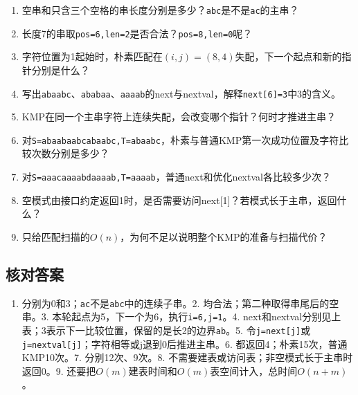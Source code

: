 \begin{enumerate}
\def\labelenumi{\arabic{enumi}.}
\tightlist
\item
  空串和只含三个空格的串长度分别是多少？\texttt{abc}是不是\texttt{ac}的主串？
\item
  长度7的串取\texttt{pos=\allowbreak{}6,\allowbreak{}len=\allowbreak{}2}是否合法？\texttt{pos=\allowbreak{}8,\allowbreak{}len=\allowbreak{}0}呢？
\item
  字符位置为1起始时，朴素匹配在\((i,j)=(8,4)\)失配，下一个起点和新的指针分别是什么？
\item
  写出\texttt{abaabc}、\texttt{ababaa}、\texttt{aaaab}的next与nextval，解释\texttt{next[\allowbreak{}6]\allowbreak{}=\allowbreak{}3}中3的含义。
\item
  KMP在同一个主串字符上连续失配，会改变哪个指针？何时才推进主串？
\item
  对\texttt{S=\allowbreak{}abaabaabcabaabc,\allowbreak{}T=\allowbreak{}abaabc}，朴素与普通KMP第一次成功位置及字符比较次数分别是多少？
\item
  对\texttt{S=\allowbreak{}aaacaaaabdaaaab,\allowbreak{}T=\allowbreak{}aaaab}，普通next和优化nextval各比较多少次？
\item
  空模式由接口约定返回1时，是否需要访问next{[}1{]}？若模式长于主串，返回什么？
\item
  只给匹配扫描的\(O(n)\)，为何不足以说明整个KMP的准备与扫描代价？
\end{enumerate}

\subsection{核对答案}\label{DS04-answers}

\begin{enumerate}
\def\labelenumi{\arabic{enumi}.}
\tightlist
\item
  分别为0和3；\texttt{ac}不是\texttt{abc}中的连续子串。2. 均合法；第二种取得串尾后的空串。3. 本轮起点为5，下一个为6，执行\texttt{i=\allowbreak{}6,\allowbreak{}j=\allowbreak{}1}。4. next和nextval分别见上表；3表示下一比较位置，保留的是长2的边界\texttt{ab}。5. 令\texttt{j=\allowbreak{}next[\allowbreak{}j]\allowbreak{}}或\texttt{j=\allowbreak{}nextval[\allowbreak{}j]\allowbreak{}}；字符相等或j退到0后推进主串。6. 都返回4；朴素15次，普通KMP10次。7. 分别12次、9次。8. 不需要建表或访问表；非空模式长于主串时返回0。9. 还要把\(O(m)\)建表时间和\(O(m)\)表空间计入，总时间\(O(n+m)\)。
\end{enumerate}
